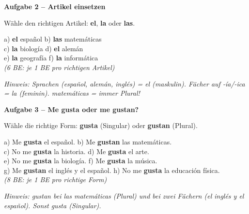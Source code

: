 \documentclass[11pt, a4paper]{article}
\newcommand{\fachfarbe}{spanisch}
\newcommand{\punktebox}[1]{\hfill\fbox{\small \_\_\_/#1}}
\newcommand{\lsg}[1]{\textcolor{loesung}{\textbf{#1}}}
\newenvironment{aufgabe}[1]{%
    \vspace{12pt}
    \noindent\textbf{\textcolor{\fachfarbe}{Aufgabe #1}}
    \vspace{6pt}
    \begin{list}{}{\leftmargin=0pt}
    \item[]
}{%
    \end{list}
}
\newcommand{\es}[1]{\textcolor{\fachfarbe}{\textbf{#1}}}
\begin{document}
\vspace{15pt}


\begin{aufgabe}{2 -- Artikel einsetzen}
Wähle den richtigen Artikel: \es{el}, \es{la} oder \es{las}. \punktebox{6}
\end{aufgabe}

\noindent
a) \lsg{el} español \hfill
b) \lsg{las} matemáticas \\[0.8em]
c) \lsg{la} biología \hfill
d) \lsg{el} alemán \\[0.8em]
e) \lsg{la} geografía \hfill
f) \lsg{la} informática \\

\textcolor{loesung}{\textit{(6 BE: je 1 BE pro richtigen Artikel)}}

\textcolor{loesung}{\textit{Hinweis: Sprachen (español, alemán, inglés) = el (maskulin). Fächer auf -ía/-ica = la (feminin). matemáticas = immer Plural!}}

\vspace{15pt}


\begin{aufgabe}{3 -- Me gusta oder me gustan?}
Wähle die richtige Form: \es{gusta} (Singular) oder \es{gustan} (Plural). \punktebox{8}
\end{aufgabe}

\noindent
a) Me \lsg{gusta} el español. \hfill
b) Me \lsg{gustan} las matemáticas. \\[0.8em]
c) No me \lsg{gusta} la historia. \hfill
d) Me \lsg{gusta} el arte. \\[0.8em]
e) No me \lsg{gusta} la biología. \hfill
f) Me \lsg{gusta} la música. \\[0.8em]
g) Me \lsg{gustan} el inglés y el español. \hfill
h) No me \lsg{gusta} la educación física. \\

\textcolor{loesung}{\textit{(8 BE: je 1 BE pro richtige Form)}}

\textcolor{loesung}{\textit{Hinweis: gustan bei las matemáticas (Plural) und bei zwei Fächern (el inglés y el español). Sonst gusta (Singular).}}
\end{document}
